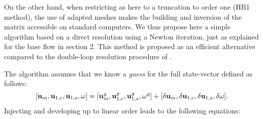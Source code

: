 \documentclass[twocolumn,10pt]{asme2ej}
\begin{document}
On the other hand, when restricting as here to a truncation to order one (HB1 method), the use of adapted meshes makes the building and inversion of the matrix accessible on standard computers.
We thus propose here a simple algorithm based on a direct resolution using a Newton iteration, just as explained for the base flow in section 2. This method is proposed as an efficient alternative compared to the double-loop resolution procedure of \cite{MLugo2014}.

The algorithm assumes that we know a {\em guess} for the full state-vector defined as follows:
$$
[{\bf u }_m, {\bf u }_{1,c}, {\bf u }_{1,s}, \omega] = 
 [{\bf u }_m^g, {\bf u }_{1,c}^g, {\bf u }_{1,s}^g, \omega^g]
+ [\delta {\bf u }_m, \delta {\bf u }_{1,c}, \delta {\bf u }_{1,s}, \delta \omega].
$$
Injecting and developing up to linear order leads to the following equations:
\iffalse
\begin{subequations}\label{eq:harmonic_total}
\begin{eqnarray}
\begin{split}
&{\cal NS}(  {\bf u }_m^g ) - \frac{1}{4} \big[ {\cal C}( {\bf u }_{1,c}^g,{\bf u }_{1,c}^g) +  {\cal C}( {\bf u }_{1,s}^g,{\bf u }_{1,s}^g) \big]+ {\cal LNS}_{{\bf u }_m^g}(\delta {\bf u }_m)
\\
&-\frac{1}{2} \big[ {\cal C}( {\bf u }_{1,c}^g,\delta {\bf u }_{1,c}) +  {\cal C}( {\bf u }_{1,s}^g,\delta {\bf u }_{1,s}) \big] = 0,
\end{split}
\label{HB_1}
\\
\begin{split}
{\cal LNS}_{{\bf u }_m^g}( {\bf u }_{1,c}^g) - \omega^g {\bf u }_{1,s}^g& -  {\cal C}( \delta {\bf u }_{m}, {\bf u }_{1,c}^g)
\\
&+{\cal LNS}_{{\bf u }_m^g}( \delta {\bf u }_{1,c})  - \omega^g \delta {\bf u }_{1,s}  
 - \delta \omega {\bf u }_{1,s}^g = 0 ,
 \end{split}
\label{HB_2}
\\
\begin{split}
{\cal LNS}_{{\bf u }_m^g}({\bf u }_{1,s}^g) + \omega^g {\bf u }_{1,c}^g& -  {\cal C}( \delta {\bf u }_{m}, {\bf u }_{1,s}^g)
\\
&+{\cal LNS}_{{\bf u }_m^g}( \delta {\bf u }_{1,s}) + \omega^g \delta {\bf u }_{1,c} +  \delta \omega {\bf u }_{1,c}^g= 0 ,
\end{split}
\label{HB_3}
\\
\begin{split}
 F_y({\bf u }_{1,s}^g) + F_y(\delta {\bf u }_{1,s}) = 0. \qquad \qquad \qquad \qquad \qquad \qquad \quad
\end{split}
\end{eqnarray}
\end{subequations}
\fi
\end{document}
